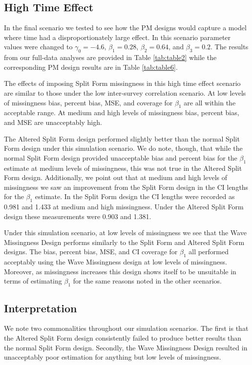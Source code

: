\documentclass{svjour3}                     %
\begin{document}
\subsection{High Time Effect}
\label{sec:3.4}
In the final scenario we tested to see how the PM designs would capture a model where time had a disproportionately large effect. In this scenario parameter values were changed to $\gamma_0 = -4.6$, $\beta_1 = 0.28$, $\beta_2 = 0.64$, and $\beta_3 = 0.2$. The results from our full-data analyses are provided in Table \ref{tab:table2} while the corresponding PM design results are in Table \ref{tab:table6}. \par

The effects of imposing Split Form missingness in this high time effect scenario are similar to those under the low inter-survey correlation scenario. At low levels of missingness bias, percent bias, MSE, and coverage for $\beta_1$ are all within the acceptable range. At medium and high levels of missingness bias, percent bias, and MSE are unacceptably high. \par 

The Altered Split Form design performed slightly better than the normal Split Form design under this simulation scenario. We do note, though, that while the normal Split Form design provided unacceptable bias and percent bias for the $\beta_1$ estimate at medium levels of missingness, this was not true in the Altered Split Form design. Additionally, we point out that at medium and high levels of missingness we saw an improvement from the Split Form design in the CI lengths for the $\beta_1$ estimate. In the Split Form design the CI lengths were recorded as 0.981 and 1.433 at medium and high missingness. Under the Altered Split Form design these measurements were 0.903 and 1.381. \par

Under this simulation scenario, at low levels of missingness we see that the Wave Missingness Design performs similarly to the Split Form and Altered Split Form designs. The bias, percent bias, MSE, and CI coverage for $\beta_1$ all performed acceptably using the Wave Missingness design at low levels of missingness. Moreover, as missingness increases this design shows itself to be unsuitable in terms of estimating $\beta_1$ for the same reasons noted in the other scenarios. \par

\subsection{Interpretation}
\label{sec:3.5}
We note two commonalities throughout our simulation scenarios. The first is that the Altered Split Form design consistently failed to produce better results than the normal Split Form design. Secondly, the Wave Missingness Design resulted in unacceptably poor estimation for anything but low levels of missingness. \par
\end{document}
